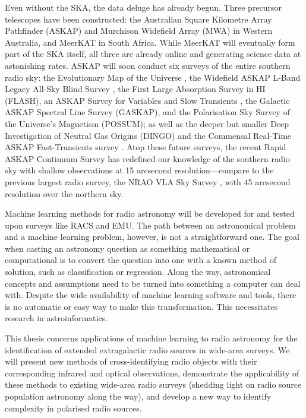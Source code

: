 \documentclass[11pt, a4paper]{book}
\begin{document}
Even without the SKA, the data deluge has already begun. Three precursor telescopes have been constructed: the Australian Square Kilometre Array Pathfinder \linebreak(ASKAP) and Murchison Widefield Array (MWA) in Western Australia, and MeerKAT in South Africa. While MeerKAT will eventually form part of the SKA itself, all three are already online and generating science data at astonishing rates. ASKAP will soon conduct six surveys of the entire southern radio sky: the Evolutionary Map of the Universe \citep[EMU;][]{norris11,kapinska_emu_2020}, the Widefield ASKAP L-Band Legacy All-Sky Blind Survey \citep[WALLABY]{koribalski_wallaby_2020}, the First Large Absorption Survey in HI (FLASH), an ASKAP Survey for Variables and Slow Transients \citep[VAST;][]{murphy_vast_2013}, the Galactic ASKAP Spectral Line Survey (GASKAP), and the Polarisation Sky Survey of the Universe's Magnetism (POSSUM); as well as the deeper but smaller Deep Investigation of Neutral Gas Origins (DINGO) and the Commensal Real-Time ASKAP Fast-Transients survey \citep[CRAFT;][]{macquart10craft}. Atop these future surveys, the recent Rapid ASKAP Continuum Survey \citep[RACS;][]{mcconnell_rapid_2020} has redefined our knowledge of the southern radio sky with shallow observations at 15 arcsecond resolution---compare to the previous largest radio survey, the NRAO VLA Sky Survey \citep[NVSS;][]{condon98nvss}, with 45 arcsecond resolution over the northern sky.

Machine learning methods for radio astronomy will be developed for and tested upon surveys like RACS and EMU. The path between an astronomical problem and a machine learning problem, however, is not a straightforward one. The goal when casting an astronomy question as something mathematical or computational is to convert the question into one with a known method of solution, such as classification or regression. Along the way, astronomical concepts and assumptions need to be turned into something a computer can deal with. Despite the wide availability of machine learning software and tools, there is no automatic or easy way to make this transformation. This necessitates research in astroinformatics.

This thesis concerns applications of machine learning to radio astronomy for the identification of extended extragalactic radio sources in wide-area surveys. We will present new methods of cross-identifying radio objects with their corresponding infrared and optical observations, demonstrate the applicability of these methods to existing wide-area radio surveys (shedding light on radio source population astronomy along the way), and develop a new way to identify complexity in polarised radio sources.
\end{document}
